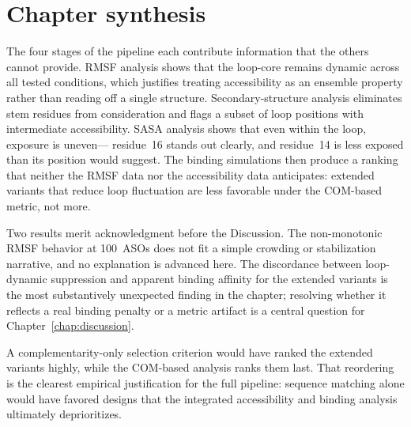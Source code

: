 \section{Chapter synthesis}
\label{sec:results-synthesis}

The four stages of the pipeline each contribute information that the others
cannot provide.
RMSF analysis shows that the loop-core remains dynamic across all tested
conditions, which justifies treating accessibility as an ensemble property
rather than reading off a single structure.
Secondary-structure analysis eliminates stem residues from consideration
and flags a subset of loop positions with intermediate accessibility.
SASA analysis shows that even within the loop, exposure is uneven---
residue~16 stands out clearly, and residue~14 is less exposed than its
position would suggest.
The binding simulations then produce a ranking that neither the RMSF data
nor the accessibility data anticipates: extended variants that reduce loop
fluctuation are less favorable under the COM-based metric, not more.

Two results merit acknowledgment before the Discussion.
The non-monotonic RMSF behavior at 100~ASOs does not fit a simple crowding
or stabilization narrative, and no explanation is advanced here.
The discordance between loop-dynamic suppression and apparent binding
affinity for the extended variants is the most substantively unexpected
finding in the chapter; resolving whether it reflects a real binding
penalty or a metric artifact is a central question for
Chapter~\ref{chap:discussion}.

A complementarity-only selection criterion would have ranked the extended
variants highly, while the COM-based analysis ranks them last.
That reordering is the clearest empirical justification for the full
pipeline: sequence matching alone would have favored designs that the
integrated accessibility and binding analysis ultimately deprioritizes.